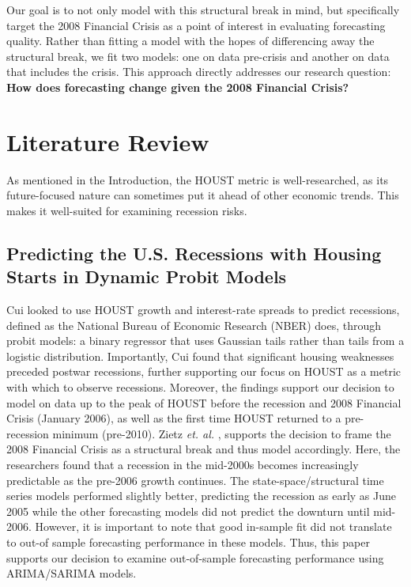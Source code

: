 \documentclass[10pt,twocolumn,letterpaper]{article}
\begin{document}
Our goal is to not only model with this structural break in mind, but specifically target the 2008 Financial Crisis as a point of interest in evaluating forecasting quality. Rather than fitting a model with the hopes of differencing away the structural break, we fit two models: one on data pre-crisis and another on data that includes the crisis. This approach directly addresses our research question: \textbf{How does forecasting change given the 2008 Financial Crisis?}

\section{Literature Review}
\label{sec:literature_review}

As mentioned in the Introduction, the HOUST metric is well-researched, as its future-focused nature can sometimes put it ahead of other economic trends. This makes it well-suited for examining recession risks.
\subsection{Predicting the U.S. Recessions with Housing Starts in Dynamic Probit Models}

Cui \cite{cui2015predicting} looked to use HOUST growth and interest-rate spreads to predict recessions, defined as the National Bureau of Economic Research (NBER) does, through probit models: a binary regressor that uses Gaussian tails rather than tails from a logistic distribution. Importantly, Cui found that significant housing weaknesses preceded postwar recessions, further supporting our focus on HOUST as a metric with which to observe recessions. Moreover, the findings support our decision to model on data up to the peak of HOUST before the recession and 2008 Financial Crisis (January 2006), as well as the first time HOUST returned to a pre-recession minimum (pre-2010). Zietz \textit{et. al.} \cite{ZIETZ2014271}, supports the decision to frame the 2008 Financial Crisis as a structural break and thus model accordingly. Here, the researchers found that a recession in the mid-2000s becomes increasingly predictable as the pre-2006 growth continues. The state-space/structural time series models performed slightly better, predicting the recession as early as June 2005 while the other forecasting models did not predict the downturn until mid-2006. However, it is important to note that good in-sample fit did not translate to out-of sample forecasting performance in these models. Thus, this paper supports our decision to examine out-of-sample forecasting performance using ARIMA/SARIMA models.
\end{document}
